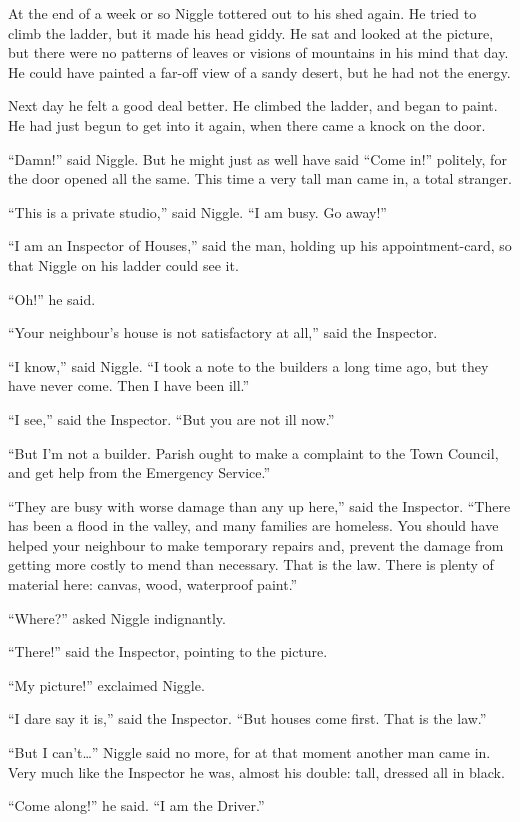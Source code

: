 \documentclass[english]{scrartcl}
\begin{document}
At the end of a week or so Niggle tottered out to his shed again. He tried to climb the ladder, but it made his head giddy. He sat and looked at the picture, but there were no patterns of leaves or visions of mountains in his mind that day. He could have painted a far-off view of a sandy desert, but he had not the energy.

Next day he felt a good deal better. He climbed the ladder, and began to paint. He had just begun to get into it again, when there came a knock on the door.

“Damn!” said Niggle. But he might just as well have said “Come in!” politely, for the door opened all the same. This time a very tall man came in, a total stranger.

“This is a private studio,” said Niggle. “I am busy. Go away!”

“I am an Inspector of Houses,” said the man, holding up his appointment-card, so that Niggle on his ladder could see it.

“Oh!” he said.

“Your neighbour’s house is not satisfactory at all,” said the Inspector.

“I know,” said Niggle. “I took a note to the builders a long time ago, but they have never come. Then I have been ill.”

“I see,” said the Inspector. “But you are not ill now.”

“But I’m not a builder. Parish ought to make a complaint to the Town Council, and get help from the Emergency Service.”

“They are busy with worse damage than any up here,” said the Inspector. “There has been a flood in the valley, and many families are homeless. You should have helped your neighbour to make temporary repairs and, prevent the damage from getting more costly to mend than necessary. That is the law. There is plenty of material here: canvas, wood, waterproof paint.”

“Where?” asked Niggle indignantly.

“There!” said the Inspector, pointing to the picture.

“My picture!” exclaimed Niggle.

“I dare say it is,” said the Inspector. “But houses come first. That is the law.”

“But I can’t…” Niggle said no more, for at that moment another man came in. Very much like the Inspector he was, almost his double: tall, dressed all in black.

“Come along!” he said. “I am the Driver.”
\end{document}
